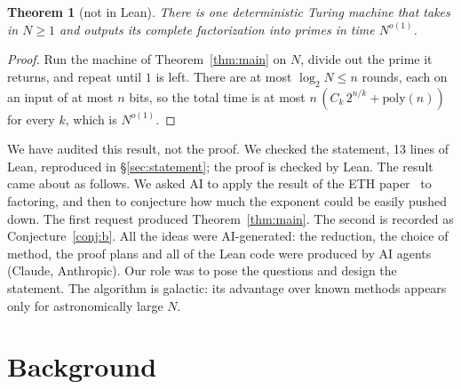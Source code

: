 \documentclass[11pt]{article}
\newtheorem{theorem}{Theorem}
\begin{document}
\begin{theorem}[not in Lean]\label{thm:full}
There is one deterministic Turing machine that takes in $N\ge1$ and outputs its complete factorization into
primes in time $N^{o(1)}$.
\end{theorem}

\begin{proof}
Run the machine of Theorem~\ref{thm:main} on $N$, divide out the prime it returns, and repeat until $1$ is
left. There are at most $\log_2 N\le n$ rounds, each on an input of at most $n$ bits, so the total time is at
most $n\,(C_k\,2^{n/k}+\mathrm{poly}(n))$ for every $k$, which is $N^{o(1)}$.
\end{proof}

We have audited this result, not the proof. 
We checked the statement, 13 lines of Lean, reproduced in \S\ref{sec:statement}; the proof is checked by Lean.
The result came about as follows. We asked AI to apply the result of the ETH paper~\cite{Ope26} to factoring,
and then to conjecture how much the exponent could be easily pushed down. The first request produced
Theorem~\ref{thm:main}. The second is recorded as Conjecture~\ref{conj:b}. All the ideas were AI-generated: the
reduction, the choice of method, the proof plans and all of the Lean code were produced by AI agents (Claude,
Anthropic). Our role was to pose the questions and design the statement.
The algorithm is galactic: its advantage over known methods appears only for astronomically large $N$.

\section{Background}\label{sec:background}
\end{document}
